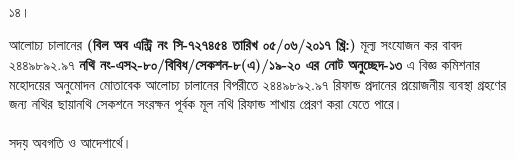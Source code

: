 \documentclass[12pt]{article}
\begin{document}
\\
\\
\\
\begin{minipage}[t]{0.05\linewidth}
১৪।
\end{minipage}
\begin{minipage}[t]{1\linewidth}
আলোচ্য চালানের
\textbf{(বিল অব এন্ট্রি নং সি-৭২৭৪৫৪ তারিখ ০৫/০৬/২০১৭ খ্রি:)}
মূল্য সংযোজন কর বাবদ
২৪৪৯৮৯২.৯৭
\textbf{নথি নং-এস২-৮০/বিবিধ/সেকশন-৮(এ)/১৯-২০
এর নোট অনুচ্ছেদ-১৩} এ বিজ্ঞ কমিশনার মহোদয়ের
অনুমোদন মোতাবেক আলোচ্য চালানের
বিপরীতে
২৪৪৯৮৯২.৯৭
রিফান্ড প্রদানের প্রয়োজনীয় ব্যবস্থা গ্রহণের জন্য
নথির ছায়ানথি সেকশনে সংরক্ষন পূর্বক
মূল নথি রিফান্ড শাখায় প্রেরণ করা যেতে পারে।
\\
\\
সদয় অবগতি ও আদেশার্থে।
\end{minipage}

\thispagestyle{laststyle}
\end{document}
